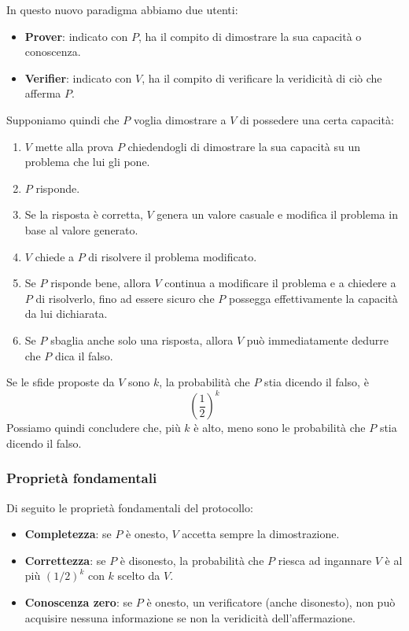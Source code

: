 In questo nuovo paradigma abbiamo due utenti:
\begin{itemize}
	\item \textbf{Prover}: indicato con $P$, ha il compito di dimostrare la sua capacit\`a o conoscenza.
	\item \textbf{Verifier}: indicato con $V$, ha il compito di verificare la veridicit\`a di ci\`o che afferma $P$.
\end{itemize}

Supponiamo quindi che $P$ voglia dimostrare a $V$ di possedere una certa capacit\`a:
\begin{enumerate}
	\item $V$ mette alla prova $P$ chiedendogli di dimostrare la sua capacit\`a su un problema che lui gli pone.
	\item $P$ risponde.
	\item Se la risposta \`e corretta, $V$ genera un valore casuale e modifica il problema in base al valore generato.
	\item $V$ chiede a $P$ di risolvere il problema modificato.
	\item Se $P$ risponde bene, allora $V$ continua a modificare il problema e a chiedere a $P$ di risolverlo, fino ad
	      essere sicuro che $P$ possegga effettivamente la capacit\`a da lui dichiarata.
	\item Se $P$ sbaglia anche solo una risposta, allora $V$ pu\`o immediatamente dedurre che $P$ dica il falso.
\end{enumerate}
Se le sfide proposte da $V$ sono $k$, la probabilit\`a che $P$ stia dicendo il falso, \`e
\[ \left( \frac{1}{2} \right)^k \]
Possiamo quindi concludere che, pi\`u $k$ \`e alto, meno sono le probabilit\`a che $P$ stia dicendo il falso.

\subsubsection{Propriet\`a fondamentali}
Di seguito le propriet\`a fondamentali del protocollo:
\begin{itemize}
	\item \textbf{Completezza}: se $P$ \`e onesto, $V$ accetta sempre la dimostrazione.
	\item \textbf{Correttezza}: se $P$ \`e disonesto, la probabilit\`a che $P$ riesca ad ingannare $V$ \`e al pi\`u
	      $(1/2)^k$ con $k$ scelto da $V$.
	\item \textbf{Conoscenza zero}: se $P$ \`e onesto, un verificatore (anche disonesto), non pu\`o acquisire nessuna
	      informazione se non la veridicit\`a dell'affermazione.
\end{itemize}

